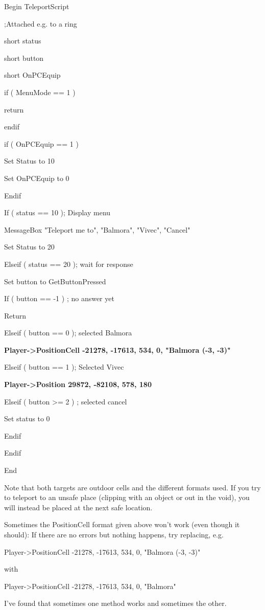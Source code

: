 \documentclass[
]{article}
\begin{document}
Begin TeleportScript

;Attached e.g. to a ring

short status

short button

short OnPCEquip

if ( MenuMode == 1 )

return

endif

if ( OnPCEquip == 1 )

Set Status to 10

Set OnPCEquip to 0

Endif

If ( status == 10 ); Display menu

MessageBox "Teleport me to", "Balmora", "Vivec", "Cancel"

Set Status to 20

Elseif ( status == 20 ); wait for response

Set button to GetButtonPressed

If ( button == -1 ) ; no answer yet

Return

Elseif ( button == 0 ); selected Balmora

\textbf{Player-\textgreater PositionCell -21278, -17613, 534, 0,
"Balmora (-3, -3)"}

Elseif ( button == 1 ); Selected Vivec

\textbf{Player-\textgreater Position 29872, -82108, 578, 180}

Elseif ( button \textgreater= 2 ) ; selected cancel

Set status to 0

Endif

Endif

End

Note that both targets are outdoor cells and the different formats used.
If you try to teleport to an unsafe place (clipping with an object or
out in the void), you will instead be placed at the next safe location.

Sometimes the PositionCell format given above won't work (even though it
should): If there are no errors but nothing happens, try replacing, e.g.

Player-\textgreater PositionCell -21278, -17613, 534, 0, "Balmora (-3,
-3)"

with

Player-\textgreater PositionCell -21278, -17613, 534, 0, "Balmora"

I've found that sometimes one method works and sometimes the other.
\end{document}
